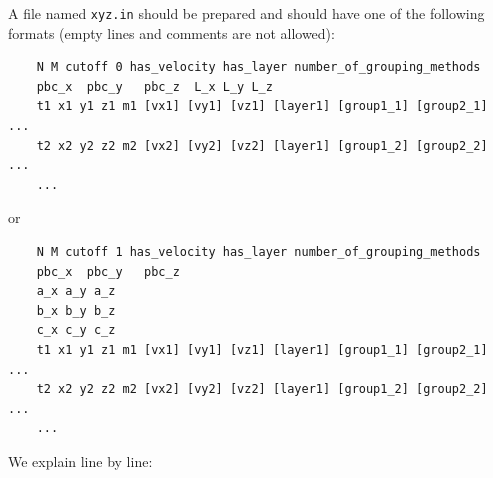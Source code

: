 \documentclass[12pt,a4paper]{report}
\begin{document}
A file named \verb"xyz.in" should be prepared and should have one of the following formats (empty lines and comments are not allowed):
\begin{verbatim}
    N M cutoff 0 has_velocity has_layer number_of_grouping_methods
    pbc_x  pbc_y   pbc_z  L_x L_y L_z
    t1 x1 y1 z1 m1 [vx1] [vy1] [vz1] [layer1] [group1_1] [group2_1] ...
    t2 x2 y2 z2 m2 [vx2] [vy2] [vz2] [layer1] [group1_2] [group2_2] ...
    ...
\end{verbatim}
or
\begin{verbatim}
    N M cutoff 1 has_velocity has_layer number_of_grouping_methods
    pbc_x  pbc_y   pbc_z  
    a_x a_y a_z
    b_x b_y b_z
    c_x c_y c_z
    t1 x1 y1 z1 m1 [vx1] [vy1] [vz1] [layer1] [group1_1] [group2_1] ...
    t2 x2 y2 z2 m2 [vx2] [vy2] [vz2] [layer1] [group1_2] [group2_2] ...
    ...
\end{verbatim}
We explain line by line:
\end{document}
